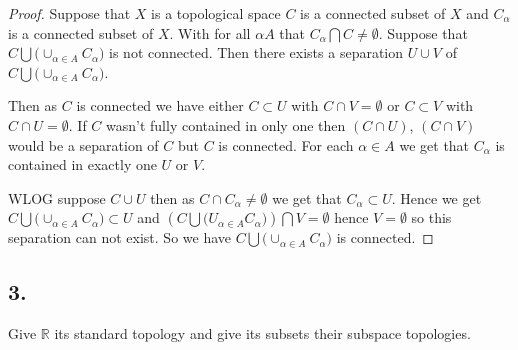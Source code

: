 \documentclass{amsart}
\theoremstyle{plain}
\theoremstyle{definition}
\theoremstyle{remark}
\begin{document}
\begin{proof}
    Suppose that $X$ is a topological space $C$ is a connected subset of $X$ and $C_{\alpha}$ is a connected subset of $X$. With for all $\alpha A$ that $C_\alpha \bigcap C\not = \emptyset$. Suppose that $C\bigcup \big ( \cup _{\alpha \in A} C_\alpha \big)$ is not connected. Then there exists a separation $U\cup V$ of $C\bigcup \big(\cup _{\alpha \in A} C_\alpha \big)$. 
    
    Then as $C$ is connected we have either $C\subset U$ with $C\cap V=\emptyset$ or $C\subset V$ with $C\cap U=\emptyset$. If $C$ wasn't fully contained in only one then $(C\cap U)$, $(C\cap V)$ would be a separation of $C$ but $C$ is connected. For each $\alpha \in A$ we get that $C_\alpha$ is contained in exactly one $U$ or $V$.
    
    WLOG suppose $C\cup U$ then as $C\cap C_\alpha \not = \emptyset $ we get that $C_\alpha \subset U$. Hence we get $C\bigcup \big(\cup _{\alpha \in A}C_\alpha \big)\subset U$ and $\left(C\bigcup \big(U_{\alpha\in A} C_\alpha \big)\right) \bigcap V=\emptyset$ hence $V=\emptyset$ so this separation can not exist. So we have $C\bigcup \big( \cup _{\alpha \in A}C_\alpha \big)$ is connected. 
\end{proof}

\subsection*{3.} Give $\mathbb{R}$ its standard topology and give its subsets their subspace topologies.
\end{document}
